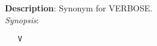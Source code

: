 \section{\quad{}}
\label{manpages:V}
\label{manpages:v}
\vspace{-0.1in}
{\bf Description}: 	Synonym for VERBOSE.\\[1.5ex]
{\em Synopsis}:
\vspace{-0.05in}
\scriptsize
\begin{lstlisting}
   V   																						
\end{lstlisting}
\normalsize
\vspace{-0.05in}

